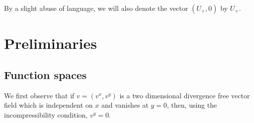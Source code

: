 \documentclass[11pt]{article}
\begin{document}
By a slight abuse of language, we will also denote the vector $(U_+,0)$ by $U_+$.




\section{Preliminaries}







\subsection{Function spaces}



We first observe that if $v = (v^x,v^y)$ is a two dimensional divergence free vector field which is independent on $x$ 
and vanishes at $y = 0$, then, using the incompressibility condition, $v^y = 0$.
\end{document}
